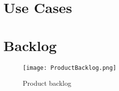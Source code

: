 \section{Use Cases}

\section{Backlog}

\begin{figure} \label{fml}
    \caption{Product backlog}
    \centering
        \texttt{[image: ProductBacklog.png]}
\end{figure}

